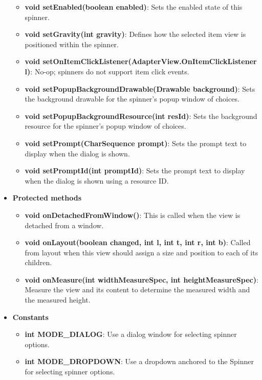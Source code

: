\documentclass{report}
\begin{document}
\begin{itemize}
\begin{itemize}
                \item \textbf{void setEnabled(boolean enabled)}: Sets the enabled state of this spinner.
                \item \textbf{void setGravity(int gravity)}: Defines how the selected item view is positioned within the spinner.
                \item \textbf{void setOnItemClickListener(AdapterView.OnItemClickListener l)}: No-op; spinners do not support item click events.
                \item \textbf{void setPopupBackgroundDrawable(Drawable background)}: Sets the background drawable for the spinner’s popup window of choices.
                \item \textbf{void setPopupBackgroundResource(int resId)}: Sets the background resource for the spinner’s popup window of choices.
                \item \textbf{void setPrompt(CharSequence prompt)}: Sets the prompt text to display when the dialog is shown.
                \item \textbf{void setPromptId(int promptId)}: Sets the prompt text to display when the dialog is shown using a resource ID.
            \end{itemize}

        \item \textbf{Protected methods}
            \begin{itemize}
                \item \textbf{void onDetachedFromWindow()}: This is called when the view is detached from a window.
                \item \textbf{void onLayout(boolean changed, int l, int t, int r, int b)}: Called from layout when this view should assign a size and position to each of its children.
                \item \textbf{void onMeasure(int widthMeasureSpec, int heightMeasureSpec)}: Measure the view and its content to determine the measured width and the measured height.
            \end{itemize}
        \item \textbf{Constants}
            \begin{itemize}
                \item \textbf{int MODE\_DIALOG}: Use a dialog window for selecting spinner options.
                \item \textbf{int MODE\_DROPDOWN}: Use a dropdown anchored to the Spinner for selecting spinner options.
            \end{itemize}

    \end{itemize}
\end{document}
